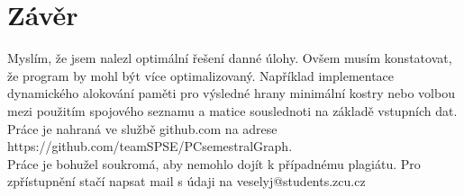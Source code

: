 \documentclass[12pt, a4paper]{report}
\begin{document}
\chapter{Závěr}
Myslím, že jsem nalezl optimální řešení danné úlohy. Ovšem musím konstatovat, že program by mohl být více optimalizovaný. Například implementace dynamického alokování paměti pro výsledné hrany minimální kostry nebo volbou mezi použitím spojového seznamu a matice souslednoti na základě vstupních dat.\\
Práce je nahraná ve službě github.com na adrese \\https://github.com/teamSPSE/PCsemestralGraph. \\Práce je bohužel soukromá, aby nemohlo dojít k případnému plagiátu. Pro zpřístupnění stačí napsat mail s údaji na veselyj@students.zcu.cz
\end{document}
